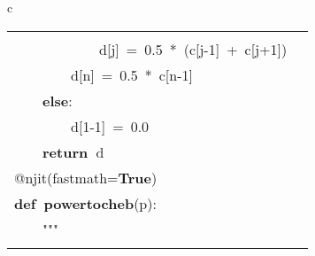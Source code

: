 \documentclass{article}\usepackage[]{graphicx}\usepackage[dvipsnames,table]{xcolor}
\makeatletter
\newcommand{\hlnum}[1]{\textcolor[rgb]{0.686,0.059,0.569}{#1}}%
\newcommand{\hlsng}[1]{\textcolor[rgb]{0.192,0.494,0.8}{#1}}%
\newcommand{\hlopt}[1]{\textcolor[rgb]{0,0,0}{#1}}%
\newcommand{\hldef}[1]{\textcolor[rgb]{0.345,0.345,0.345}{#1}}%
\newcommand{\hlkwa}[1]{\textcolor[rgb]{0.161,0.373,0.58}{\textbf{#1}}}%
\newcommand{\hlkwb}[1]{\textcolor[rgb]{0.69,0.353,0.396}{#1}}%
\newcommand{\hlkwd}[1]{\textcolor[rgb]{0.737,0.353,0.396}{\textbf{#1}}}%
\newenvironment{kframe}{%
 \def\at@end@of@kframe{}%
 \ifinner\ifhmode%
  \def\at@end@of@kframe{\end{minipage}}%
  \begin{minipage}{\columnwidth}%
 \fi\fi%
 \def\FrameCommand##1{\hskip\@totalleftmargin \hskip-\fboxsep
 \colorbox{shadecolor}{##1}\hskip-\fboxsep
     \hskip-\linewidth \hskip-\@totalleftmargin \hskip\columnwidth}%
 \MakeFramed {\advance\hsize-\width
   \@totalleftmargin\z@ \linewidth\hsize
   \@setminipage}}%
 {\par\unskip\endMakeFramed%
 \at@end@of@kframe}
\newenvironment{knitrout}{}{} %
\makeatother
\begin{document}
\begin{center}
\begin{tabular}{c}
\begin{tabular}{m{10cm}m{10cm}}
\begin{minipage}[m]{10cm}
\begin{knitrout}
\begin{kframe}
\hldef{}\hldef{\ \ \ \ \ \ \ \ }\hldef{}\hlkwa{for\ }\hldef{j\ }\hlkwa{in\ }\hldef{}\hlkwb{range}\hldef{}\hlopt{(}\hldef{}\hlnum{2}\hldef{}\hlopt{,\ }\hldef{n}\hlopt{):}\hspace*{\fill}\\
\hldef{}\hldef{\ \ \ \ \ \ \ \ \ \ \ \ }\hldef{d}\hlopt{{[}}\hldef{j}\hlopt{{]}\ =\ }\hldef{}\hlnum{0.5\ }\hldef{}\hlopt{{*}\ (}\hldef{c}\hlopt{{[}}\hldef{j}\hlopt{{-}}\hldef{}\hlnum{1}\hldef{}\hlopt{{]}\ +\ }\hldef{c}\hlopt{{[}}\hldef{j}\hlopt{+}\hldef{}\hlnum{1}\hldef{}\hlopt{{]})}\hspace*{\fill}\\
\hldef{}\hldef{\ \ \ \ \ \ \ \ }\hldef{d}\hlopt{{[}}\hldef{n}\hlopt{{]}\ =\ }\hldef{}\hlnum{0.5\ }\hldef{}\hlopt{{*}\ }\hldef{c}\hlopt{{[}}\hldef{n}\hlopt{{-}}\hldef{}\hlnum{1}\hldef{}\hlopt{{]}}\hspace*{\fill}\\
\hldef{}\hldef{\ \ \ \ }\hldef{}\hlkwa{else}\hldef{}\hlopt{:}\hldef{\ \ }\hlopt{}\hldef{}\hlslc{\#\ n\ ==\ 0}\hspace*{\fill}\\
\hldef{}\hldef{\ \ \ \ \ \ \ \ }\hldef{d}\hlopt{{[}}\hldef{}\hlnum{1}\hldef{}\hlopt{{-}}\hldef{}\hlnum{1}\hldef{}\hlopt{{]}\ =\ }\hldef{}\hlnum{0.0}\hldef{\ \ }\hlnum{}\hldef{}\hlslc{\#\ no{-}op;\ scalar\ series\ times\ y\ is\ 0\ in\ degree{-}0\ truncation}\hspace*{\fill}\\
\hldef{}\hldef{\ \ \ \ }\hldef{}\hlkwa{return\ }\hldef{d}\hspace*{\fill}
\mbox{}
\normalfont
\end{kframe}
\end{knitrout}
\end{minipage}
&
\begin{minipage}[m]{10cm}
\begin{knitrout}\tiny
\definecolor{shadecolor}{rgb}{0.969, 0.969, 0.969}\color{fgcolor}\begin{kframe}
\noindent
\ttfamily
\hldef{}\hspace*{\fill}\\
\hldef{}\hlkwb{@njit}\hldef{}\hlopt{(}\hldef{fastmath}\hlopt{=}\hldef{}\hlkwa{True}\hldef{}\hlopt{)}\hspace*{\fill}\\
\hldef{}\hlkwa{def\ }\hldef{}\hlkwd{power\textunderscore to\textunderscore cheb}\hldef{}\hlopt{(}\hldef{p}\hlopt{):}\hspace*{\fill}\\
\hldef{}\hldef{\ \ \ \ }\hldef{}\hlsng{"""}\hspace*{\fill}\\

\end{kframe}
\end{knitrout}
\end{minipage}
\end{tabular}
\end{tabular}
\end{center}
\end{document}
